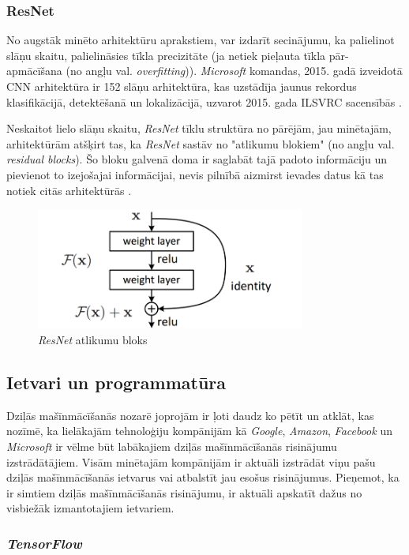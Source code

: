 \subsubsection{ResNet}
No augstāk minēto arhitektūru aprakstiem, var izdarīt secinājumu, ka palielinot slāņu skaitu, palielināsies tīkla precizitāte (ja netiek pieļauta tīkla pār-apmācīšana (no angļu val. \textit{overfitting})). \textit{Microsoft} komandas, 2015. gadā izveidotā CNN arhitektūra ir 152 slāņu arhitektūra, kas uzstādīja jaunus rekordus klasifikācijā, detektēšanā un lokalizācijā, uzvarot 2015. gada ILSVRC sacensībās \cite{ILSVRC15}. 

Neskaitot lielo slāņu skaitu,    \textit{ResNet} tīklu struktūra no pārējām, jau minētajām, arhitektūrām atšķirt tas, ka \textit{ResNet} sastāv no "atlikumu blokiem" (no angļu val. \textit{residual blocks}). Šo bloku galvenā doma ir saglabāt tajā padoto informāciju un pievienot to izejošajai informācijai, nevis pilnībā aizmirst ievades datus kā tas notiek citās arhitektūrās \cite{he2016deep}. 

\begin{figure}[h]%
	\centering
	\includegraphics[height=4cm]{images/resnet.png} %
	\caption{\textit{ResNet} atlikumu bloks \cite{he2016deep}}%
	\label{fig:example}%
\end{figure}
\subsection{Ietvari un programmatūra}
Dziļās mašīnmācīšanās nozarē joprojām ir ļoti daudz ko pētīt un atklāt, kas nozīmē, ka lielākajām tehnoloģiju kompānijām kā \textit{Google}, \textit{Amazon}, \textit{Facebook} un \textit{Microsoft} ir vēlme būt labākajiem dziļās mašīnmācīšanās risinājumu izstrādātājiem. Visām minētajām kompānijām ir aktuāli izstrādāt viņu pašu dziļās mašīnmācīšanās ietvarus vai atbalstīt jau esošus risinājumus. Pieņemot, ka ir simtiem dziļās mašīnmācīšanās risinājumu, ir aktuāli apskatīt dažus no visbiežāk izmantotajiem ietvariem.

\subsubsection{\textit{TensorFlow}}

